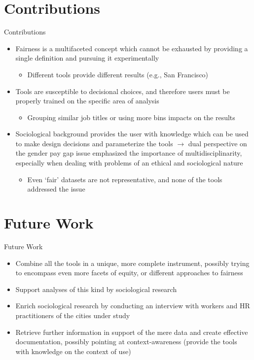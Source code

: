\documentclass[usenames,dvipsnames]{beamer}
\begin{document}
    
    \section[]{Contributions}
    \begin{frame}{Contributions}
        \begin{itemize}
            \item Fairness is a multifaceted concept which cannot be exhausted by providing a single definition and pursuing it experimentally
            \begin{itemize}
                \item Different tools provide different results (e.g., San Francisco)
            \end{itemize}
            \item Tools are susceptible to decisional choices, and therefore users must be properly trained on the specific area of analysis
            \begin{itemize}
                 \item Grouping similar job titles or using more bins impacts on the results
            \end{itemize}
            \item Sociological background provides the user with knowledge which can be used to make design decisions and parameterize the tools\newline
            $\rightarrow$ dual perspective on the gender pay gap issue emphasized the importance of multidisciplinarity, especially when dealing with problems of an ethical and sociological nature
            \begin{itemize}
                \item Even `fair' datasets are not representative, and none of the tools addressed the issue
            \end{itemize}
        \end{itemize}
    \end{frame}
    
    
    \section[]{Future Work}
    \begin{frame}{Future Work}
        \begin{itemize}
            \item Combine all the tools in a unique, more complete instrument, possibly trying to encompass even more facets of equity, or different approaches to fairness
            \item Support analyses of this kind by sociological research
            \item Enrich sociological research by conducting an interview with workers and HR practitioners of the cities under study
            \item Retrieve further information in support of the mere data and create effective documentation, possibly pointing at \textcolor{defaultBlue}{context-awareness} (provide the tools with knowledge on the context of use)
        \end{itemize}
    \end{frame}
    
\end{document}
